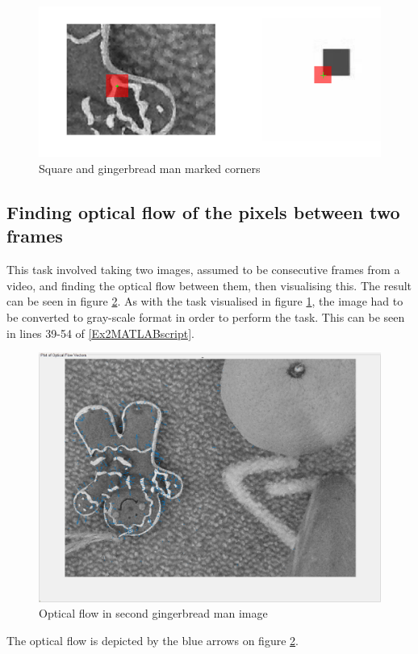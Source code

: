 \documentclass[11pt, letterpaper]{article}
\begin{document}
\begin{figure}[ht]
    \centering
    \includegraphics[width=0.75\linewidth]{Lab 2/markedCornersEdited.png}
    \caption{Square and gingerbread man marked corners}
    \label{fig:markedCorners}
\end{figure}

\subsection{Finding optical flow of the pixels between two frames}
This task involved taking two images, assumed to be consecutive frames from a video, and finding the optical flow between them, then visualising this. The result can be seen in figure \ref{fig:OpticalFlow}. As with the task visualised in figure \ref{fig:markedCorners}, the image had to be converted to gray-scale format in order to perform the task. This can be seen in lines 39-54 of \ref{Ex2MATLABscript}.

\begin{figure}[ht]
    \centering
    \includegraphics[width=0.75\linewidth]{Lab 2/OpticalFlowEdited.png}
    \caption{Optical flow in second gingerbread man image}
    \label{fig:OpticalFlow}
\end{figure}

The optical flow is depicted by the blue arrows on figure \ref{fig:OpticalFlow}.
\end{document}
